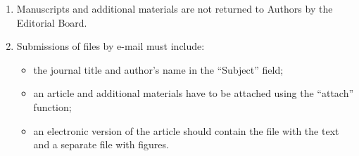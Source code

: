 {\begin{enumerate}[1.]
\noindent
\textbf{Dissertation and Thesis:}


 2009. Tekhnologiya razrabotki semanticheskogo
slovarya informatsionnogo monitoringa [Technology of development of
semantic dictionary of information monitoring system]. PhD Thesis. Moscow: IPI RAN. 23~p.


\noindent
\textbf{State standards and patents:}

GOST 8.586.5-2005. 2007. Metodika vypolneniya izmereniy. Izmerenie raskhoda i kolichestva
zhidkostey i gazov s
pomoshch'yu standartnykh suzhayushchikh ustroystv [Method of measurement.
Measurement of flow rate and volume of liquids and gases by means of orifice devices]. M.:
Standardinform
Publs. 10~p.


.
2006. Sposob orientirovaniya po krenu letatel'nogo
apparata s opti\-che\-skoy golovkoy
samonavedeniya [The way to orient on the roll of aircraft with optical homing head].
Patent RF No.\,2280590.

References in Latin transcription are presented in the original language.

References in the text are numbered according to the order of their
first appearance; the number is
placed in square brackets. All items from the reference list should be
cited.\\[-13.5pt]

\item Manuscripts and additional materials are not returned to Authors by the Editorial Board.\\[-13.5pt]

\item Submissions of files by e-mail must include:\\[-13.5pt]
\begin{itemize}
\item   the journal title and author's name in the ``Subject'' field; \\[-13.5pt]
\item   an article and additional materials have to be attached using the ``attach'' function;\\[-13.5pt]
\item   an electronic version of the article should contain the file with the text and a separate file
with figures.\\[-13.5pt]
\end{itemize}


\end{enumerate}}
